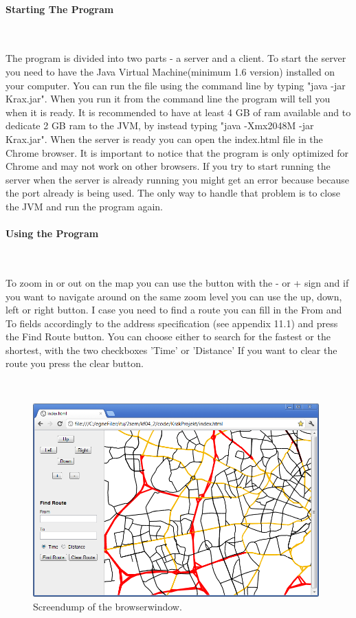 \documentclass[a4paper,10pt,titlepage]{article}
\begin{document}
		\paragraph{Starting The Program}\mbox{}\
		
		The program is divided into two parts - a server and a client. To start the server you need to have the Java Virtual Machine(minimum 1.6 version) installed on your computer. You can run the file using the command line by typing "java -jar Krax.jar". When you run it from the command line the program will tell you when it is ready. It is recommended to have at least 4 GB of ram available and to dedicate 2 GB ram to the JVM, by instead typing "java -Xmx2048M -jar Krax.jar". When the server is ready you can open the index.html file in the Chrome browser. It is important to notice that the program is only optimized for Chrome and may not work on other browsers. If you try to start running the server when the server is already running you might get an error because because the port already is being used. The only way to handle that problem is to close the JVM and run the program again.  
		\paragraph{Using the Program}\mbox{}\
		
		To zoom in or out on the map you can use the button with the - or + sign and if you want to navigate around on the same zoom level you can use the up, down, left or right button. I case you need to find a route you can fill in the From and To fields accordingly to the address specification (see appendix 11.1) and press the Find Route button. You can choose either to search for the fastest or the shortest, with the two checkboxes 'Time' or 'Distance' If you want to clear the route you press the clear button.

		 \mbox{}\\
		
		\begin{figure}[H]
\includegraphics[width=110mm]{screendump.png}
\caption{Screendump of the browserwindow.}
\label{fig:screendump}
\end{figure}
		
\end{document}
